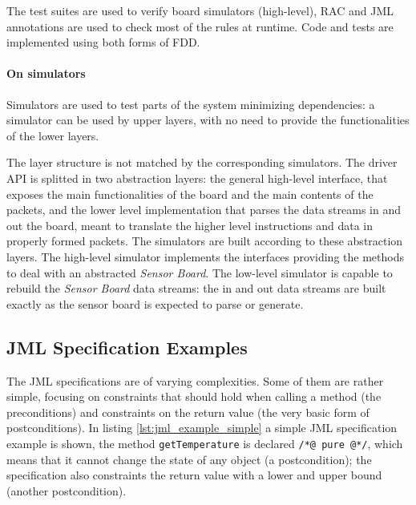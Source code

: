 \documentclass[english]{lni}
\newcommand{\lil}[1]{\texttt{\lstinline|#1|}}
\newcommand{\SB}{\emph{Sensor Board}\xspace}
\begin{document}
The test suites are used to verify board simulators (high-level), RAC and JML annotations are used to check most of the rules at runtime.
Code and tests are implemented using both forms of FDD.



\paragraph*{On simulators}

Simulators are used to test parts of the system minimizing dependencies: a simulator can be used by upper layers, with no need to provide the functionalities of the lower layers. 

The layer structure is not matched by the corresponding simulators.
The driver API is splitted in two abstraction layers: the general high-level interface, that exposes the main functionalities of the board and the main contents of the packets, and the lower level implementation that parses the data streams in and out the board, meant to translate the higher level instructions and data in properly formed packets.
The simulators are built according to these abstraction layers.
The high-level simulator implements the interfaces providing the methods to deal with an abstracted \SB.
The low-level simulator is capable to rebuild the \SB data streams: the in and out data streams are built exactly as the sensor board is expected to parse or generate.



\subsection{JML Specification Examples}
\label{subsec:a_jml_specification_example}

The JML specifications are of varying complexities.  
Some of them are rather simple, focusing on constraints that should hold when calling a method (the preconditions) and constraints on the return value (the very basic form of postconditions). 
In listing \ref{lst:jml_example_simple} a simple JML specification example is shown, the method \lil{getTemperature} is declared \lil{/*@ pure @*/}, which means that it cannot change the state of any object (a postcondition); the specification also constraints the return value with a lower and upper bound (another postcondition).
\end{document}
